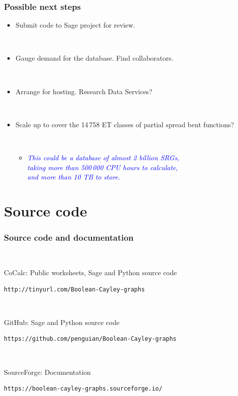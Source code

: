 \documentclass[pdf,sprung,slideColor,nocolorBG]{beamer}
\newenvironment{colortheme}[1]{
\def\ProvidesPackageRCS $##1${\relax}
\renewcommand{\ProcessOptions}{\relax}
\makeatletter

\makeatother
}{}
\newcommand{\Emph}[1]{\emph{\textcolor{blue}{#1}}}
\begin{document}
\begin{colortheme}{jubata}

\begin{frame}[fragile]
\frametitle{Possible next steps}

\begin{itemize}
 \item
Submit code to Sage project for review.

~

 \item
Gauge demand for the database. Find collaborators.

~

 \item
Arrange for hosting. Research Data Services?

~

 \item
Scale up to cover the 14\,758 ET classes of partial spread bent functions?

~

 \begin{itemize}
  \item
\Emph{This could be a database of almost 2 billion SRGs,
\\
taking more than 500\,000 CPU hours to calculate,
\\
and more than 10 TB to store.}
 \end{itemize}
\end{itemize}
\end{frame}

\end{colortheme}

\section{Source code}

\begin{colortheme}{jubata}

\begin{frame}[fragile]
\frametitle{Source code and documentation}
~

CoCalc: Public worksheets, Sage and Python source code

\begin{verbatim}
http://tinyurl.com/Boolean-Cayley-graphs
\end{verbatim}

~

GitHub: Sage and Python source code

\begin{verbatim}
https://github.com/penguian/Boolean-Cayley-graphs
\end{verbatim}

~

SourceForge: Documentation

\begin{verbatim}
https://boolean-cayley-graphs.sourceforge.io/
\end{verbatim}
\end{frame}

\end{colortheme}
\end{document}
